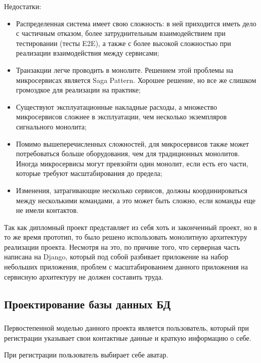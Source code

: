 Недостатки:
\begin{itemize}
    \item Распределенная система имеет свою сложность: в ней приходится иметь дело с частичным отказом, более затруднительным взаимодействием при тестировании (тесты E2E), а также с более высокой сложностью при реализации взаимодействия между сервисами;
    \item Транзакции легче проводить в монолите.
    Решением этой проблемы на микросервисах является Saga Pattern.
    Хорошее решение, но все же слишком громоздкое для реализации на практике;
    \item Существуют эксплуатационные накладные расходы, а множество микросервисов сложнее в эксплуатации, чем несколько экземпляров сигнального монолита;
    \item Помимо вышеперечисленных сложностей, для микросервисов также может потребоваться больше оборудования, чем для традиционных монолитов.
    Иногда микросервисы могут превзойти один монолит, если есть его части, которые требуют масштабирования до предела;
    \item Изменения, затрагивающие несколько сервисов, должны координироваться между несколькими командами, а это может быть сложно, если команды еще не имели контактов.


\end{itemize}
\bigbreak

Так как дипломный проект представляет из себя хоть и законченный проект, но в то же время прототип, то было решено использовать монолитную архитектуру реализации проекта.
Несмотря на это, по причине того, что серверная часть написана на Django, который под собой разбивает приложение на набор небольших приложения, проблем с масштабированием данного приложения на сервисную архитектуру не должен составить труда.


\subsection{Проектирование базы данных БД}

\subsubsection{}

Первостепенной моделью данного проекта является пользователь, который при регистрации указывает свои контактные данные и краткую информацию о себе.

При регистрации пользователь выбирает себе аватар.

